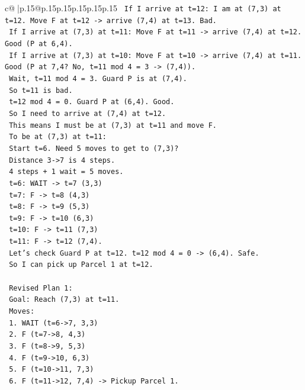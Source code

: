 \documentclass{article}
\begin{document}
{\begin{supertabular}{c@{$\;$}|p{.15\linewidth}@{}p{.15\linewidth}p{.15\linewidth}p{.15\linewidth}p{.15\linewidth}p{.15\linewidth}}
{{{\texttt{   If I arrive at t=12: I am at (7,3) at t=12. Move F at t=12 {-}> arrive (7,4) at t=13. Bad.} \\
\texttt{   If I arrive at (7,3) at t=11: Move F at t=11 {-}> arrive (7,4) at t=12. Good (P at 6,4).} \\
\texttt{   If I arrive at (7,3) at t=10: Move F at t=10 {-}> arrive (7,4) at t=11. Good (P at 7,4? No, t=11 mod 4 = 3 {-}> (7,4)).} \\
\texttt{   Wait, t=11 mod 4 = 3. Guard P is at (7,4).} \\
\texttt{   So t=11 is bad.} \\
\texttt{   t=12 mod 4 = 0. Guard P at (6,4). Good.} \\
\texttt{   So I need to arrive at (7,4) at t=12.} \\
\texttt{   This means I must be at (7,3) at t=11 and move F.} \\
\texttt{   To be at (7,3) at t=11:} \\
\texttt{   Start t=6. Need 5 moves to get to (7,3)?} \\
\texttt{   Distance 3{-}>7 is 4 steps.} \\
\texttt{   4 steps + 1 wait = 5 moves.} \\
\texttt{   t=6: WAIT {-}> t=7 (3,3)} \\
\texttt{   t=7: F {-}> t=8 (4,3)} \\
\texttt{   t=8: F {-}> t=9 (5,3)} \\
\texttt{   t=9: F {-}> t=10 (6,3)} \\
\texttt{   t=10: F {-}> t=11 (7,3)} \\
\texttt{   t=11: F {-}> t=12 (7,4).} \\
\texttt{   Let's check Guard P at t=12. t=12 mod 4 = 0 {-}> (6,4). Safe.} \\
\texttt{   So I can pick up Parcel 1 at t=12.} \\
\\ 
\texttt{   Revised Plan 1:} \\
\texttt{   Goal: Reach (7,3) at t=11.} \\
\texttt{   Moves:} \\
\texttt{   1. WAIT (t=6{-}>7, 3,3)} \\
\texttt{   2. F (t=7{-}>8, 4,3)} \\
\texttt{   3. F (t=8{-}>9, 5,3)} \\
\texttt{   4. F (t=9{-}>10, 6,3)} \\
\texttt{   5. F (t=10{-}>11, 7,3)} \\
\texttt{   6. F (t=11{-}>12, 7,4) {-}> Pickup Parcel 1.} \\
}}}
\end{supertabular}}
\end{document}
